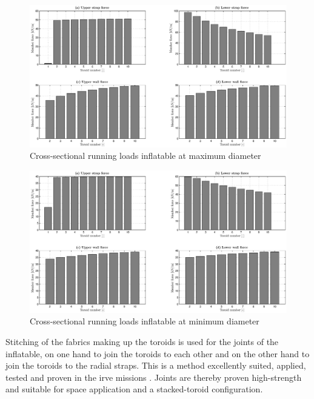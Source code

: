 \begin{figure}[h]
		\hspace{-16mm}
		\includegraphics[width=1.2\textwidth]{./Figure/Structure/loads_long.eps}
		\caption{Cross-sectional running loads inflatable at maximum diameter}
		\label{fig:strucl}
\end{figure}
\begin{figure}[h]
		\hspace{-16mm}
		\includegraphics[width=1.2\textwidth]{./Figure/Structure/loads_short.eps}
		\caption{Cross-sectional running loads inflatable at minimum diameter}
		\label{fig:strucs}
\end{figure}

Stitching of the fabrics making up the toroids is used for the joints of the inflatable, on one hand to join the toroids to each other and on the other hand to join the toroids to the radial straps. This is a method excellently suited, applied, tested and proven in the \gls{irve} missions \cite{Lindell2006,Hughes2011,Dillman2012}. Joints are thereby proven high-strength and suitable for space application and a stacked-toroid configuration.

